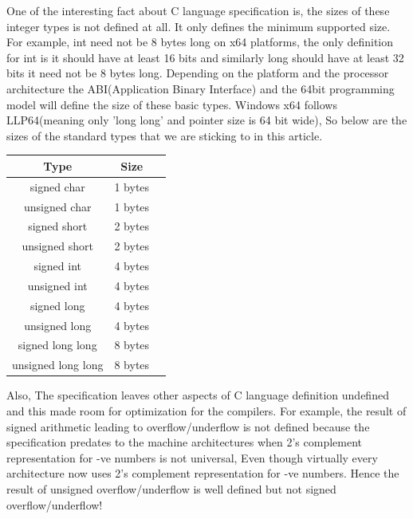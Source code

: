 \documentclass{article}
\begin{document}
One of the interesting fact about C language specification is, the sizes of
these integer types is not defined at all. It only defines the minimum supported
size. For example, int need not be 8 bytes long on x64 platforms, the only
definition for int is it should have at least 16 bits and similarly long should
have at least 32 bits it need not be 8 bytes long. Depending on the platform
and the processor architecture the ABI(Application Binary Interface) and the
64bit programming model will define the size of these basic types. Windows x64
follows LLP64(meaning only 'long long' and pointer size is 64
bit wide), So below are the sizes of the standard types that we are sticking to
in this article.

\begin{center}
\begin{tabular}{|c|c|c|}
 Type       &Size       \\
 \hline
 signed char         & 1 bytes \\
 unsigned char       & 1 bytes \\
 signed short        & 2 bytes \\
 unsigned short      & 2 bytes \\
 signed int          & 4 bytes \\
 unsigned int        & 4 bytes \\
 signed long         & 4 bytes \\
 unsigned long       & 4 bytes \\
 signed long long    & 8 bytes \\
 unsigned long long  & 8 bytes
\end{tabular}
\end{center}

Also, The specification leaves other aspects of C language definition undefined
and this made room for optimization for the compilers.
For example, the result of signed arithmetic leading to overflow/underflow is
not defined because the specification predates to the machine architectures when
2's complement representation for -ve numbers is not universal, Even though
virtually every architecture now uses 2's complement representation for -ve
numbers. Hence the result of unsigned overflow/underflow is well defined but not
signed overflow/underflow!
\end{document}
